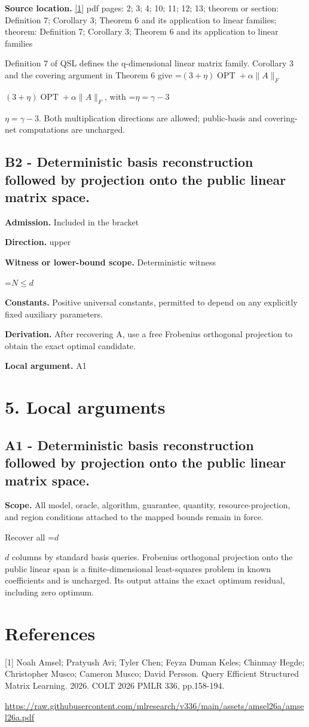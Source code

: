 \documentclass[10pt,a4paper]{article}
\newcommand{\AtlasMath}[1]{\par\begingroup\centering\setbox0=\hbox{$\displaystyle #1$}\ifdim\wd0>1.4\linewidth\typeout{ATLAS WIDE FORMULA: \the\wd0}\fi\ifdim\wd0>\linewidth\resizebox{\linewidth}{!}{\box0}\else\box0\fi\par\endgroup}
\newcommand{\AtlasInlineMath}[1]{\begingroup\setbox0=\hbox{$#1$}\ifdim\wd0>.4\linewidth\endgroup\AtlasMath{#1}\else\endgroup$#1$\fi}
\begin{document}
\textbf{Source location.} \href{https://raw.githubusercontent.com/mlresearch/v336/main/assets/amsel26a/amsel26a.pdf}{[1]} pdf pages: 2; 3; 4; 10; 11; 12; 13; theorem or section: Definition 7; Corollary 3; Theorem 6 and its application to linear families; theorem: Definition 7; Corollary 3; Theorem 6 and its application to linear families

Definition 7 of QSL defines the q-dimensional linear matrix family. Corollary 3 and the covering argument in Theorem 6 give \AtlasInlineMath{(3+\eta)\operatorname{OPT}+\alpha\|A\|_F}, with \AtlasInlineMath{\eta=\gamma-3}. Both multiplication directions are allowed; public-basis and covering-net computations are uncharged.

\subsection{B2 - Deterministic basis reconstruction followed by projection onto the public linear matrix space.}
\textbf{Admission.} Included in the bracket

\textbf{Direction.} upper

\textbf{Witness or lower-bound scope.} Deterministic witness

\AtlasMath{N\le d}
\textbf{Constants.} Positive universal constants, permitted to depend on any explicitly fixed auxiliary parameters.

\textbf{Derivation.} After recovering A, use a free Frobenius orthogonal projection to obtain the exact optimal candidate.

\textbf{Local argument.} A1

\section{5. Local arguments}
\subsection{A1 - Deterministic basis reconstruction followed by projection onto the public linear matrix space.}
\textbf{Scope.} All model, oracle, algorithm, guarantee, quantity, resource-projection, and region conditions attached to the mapped bounds remain in force.

Recover all \AtlasInlineMath{d} columns by standard basis queries. Frobenius orthogonal projection onto the public linear span is a finite-dimensional least-squares problem in known coefficients and is uncharged. Its output attains the exact optimum residual, including zero optimum.

\section{References}
[1] Noah Amsel; Pratyush Avi; Tyler Chen; Feyza Duman Keles; Chinmay Hegde; Christopher Musco; Cameron Musco; David Persson. Query Efficient Structured Matrix Learning. 2026. COLT 2026 PMLR 336, pp.158-194.

\url{https://raw.githubusercontent.com/mlresearch/v336/main/assets/amsel26a/amsel26a.pdf}
\end{document}
